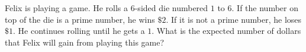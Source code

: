 Felix is playing a game. He rolls a $6$-sided die numbered $1$ to $6$. If the number on top of the die is a prime number, he wins $\$2$. If it is not a prime number, he loses $\$1$. He continues rolling until he gets a $1$. What is the expected number of dollars that Felix will gain from playing this game?
